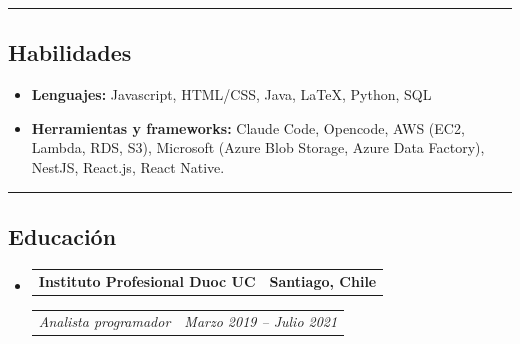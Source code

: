 \documentclass[11pt,letterpaper]{article}
\makeatletter
\newcommand{\headerrow}[2]
{\begin{tabular*}{\linewidth}{l@{\extracolsep{\fill}}r}
#1 &
#2 \\
\end{tabular*}}
\makeatother
\begin{document}
\hrule
\vspace{-1em}
\subsection*{\Large Habilidades}

\begin{itemize}[leftmargin=1em,noitemsep]
	\item \textbf{Lenguajes:}
	      Javascript, HTML/CSS, Java, \LaTeX, Python, SQL
	\item \textbf{Herramientas y frameworks:}
	      Claude Code, Opencode, AWS (EC2, Lambda, RDS, S3), Microsoft (Azure Blob Storage, Azure Data Factory), NestJS, React.js, React Native.
\end{itemize}

\hrule
\vspace{-1em}
\subsection*{\Large Educación}

\begin{itemize}[leftmargin=1em]
	\parskip=0.1em
		
	\item
	      \headerrow
	      {\textbf{Instituto Profesional Duoc UC}}
	      {\textbf{Santiago, Chile}}
	      \headerrow
	      {\emph{Analista programador} }
	      {\emph{Marzo 2019 -- Julio 2021}}
	      	      
\end{itemize}
\end{document}
